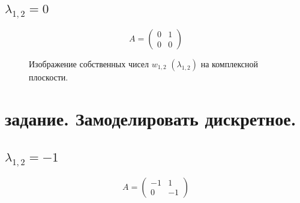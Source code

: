 \documentclass[a5paper, 10pt]{article}
\theoremstyle{definition}
\theoremstyle{plain}
\theoremstyle{remark}
\begin{document}
\subsection{$\lambda_{1, 2} = 0$}
\begin{equation}
A =
\begin{pmatrix}
 0 &  1  \\
0 & 0
\end{pmatrix}
\end{equation}
\begin{figure}[h!]
\caption{Изображение собственных чисел $w_{1, 2} \, \, \left( \lambda_{1, 2} \right)$ на комплексной плоскости.}
\end{figure}


\newpage
\section{задание. Замоделировать дискретное.}

\subsection{$\lambda_{1, 2} = -1$}

\begin{equation}
A =
\begin{pmatrix}
-1&1 \\
0& -1
\end{pmatrix}
\end{equation}
\end{document}
